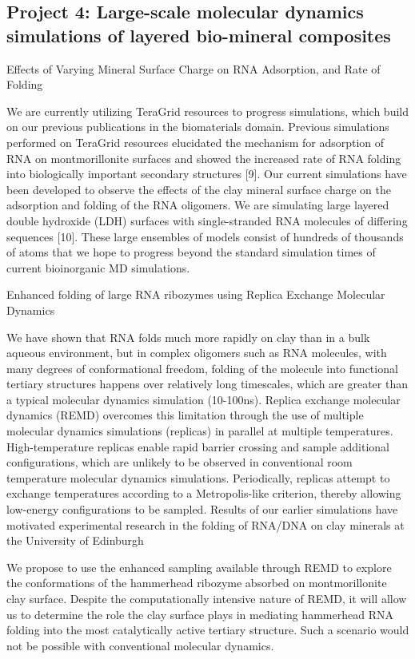 \documentclass[a4paper,10pt]{article}
\begin{document}
\subsection{Project 4: Large-scale molecular dynamics simulations of layered bio-mineral composites}


Effects of Varying Mineral Surface Charge on RNA Adsorption, and Rate of Folding

We are currently utilizing TeraGrid resources to progress simulations, which build on our previous publications in the biomaterials domain. Previous simulations performed on TeraGrid resources elucidated the mechanism for adsorption of RNA on montmorillonite surfaces and showed the increased rate of RNA folding into biologically important secondary structures [9]. Our current simulations have been developed to observe the effects of the clay mineral surface charge on the adsorption and folding of the RNA oligomers. We are simulating large layered double hydroxide (LDH) surfaces with single-stranded RNA molecules of differing sequences [10]. These large ensembles of models consist of hundreds of thousands of atoms that we hope to progress beyond the standard simulation times of current bioinorganic MD simulations.

Enhanced folding of large RNA ribozymes using Replica Exchange Molecular Dynamics

We have shown that RNA folds much more rapidly on clay than in a bulk aqueous environment,
but in complex oligomers such as RNA molecules, with many degrees of conformational freedom, folding of the molecule into functional tertiary structures happens over relatively long timescales, which are greater than a typical molecular dynamics simulation (10-100ns). Replica exchange molecular dynamics (REMD) overcomes this limitation through the use of multiple molecular dynamics simulations (replicas) in parallel at multiple temperatures. High-temperature replicas enable rapid barrier crossing and sample additional configurations, which are unlikely to be observed in conventional room temperature molecular dynamics simulations. Periodically, replicas attempt to exchange temperatures according to a Metropolis-like criterion, thereby allowing low-energy configurations to be sampled. Results of our earlier simulations have motivated experimental research in the folding of RNA/DNA on clay minerals at the University of Edinburgh

We propose to use the enhanced sampling available through REMD to explore the conformations of the hammerhead ribozyme absorbed on montmorillonite clay surface. Despite the computationally intensive nature of REMD, it will allow us to determine the role the clay surface plays in mediating hammerhead RNA folding into the most catalytically active tertiary structure. Such a scenario would not be possible with conventional molecular dynamics.
\end{document}
